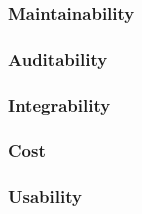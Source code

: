 \documentclass[a4paper,12pt]{report}
\begin{document}
\subsubsection{Maintainability}

\subsubsection{Auditability}

\subsubsection{Integrability}

\subsubsection{Cost}

\subsubsection{Usability}
\end{document}
